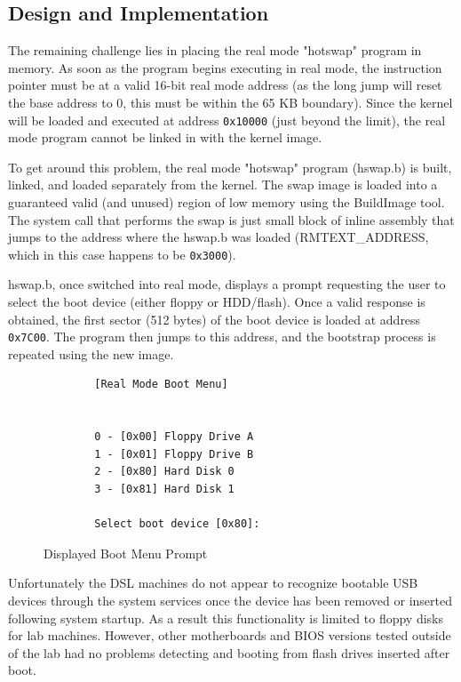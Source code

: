 \documentclass[titlepage]{article}
\begin{document}
\subsection{Design and Implementation}

The remaining challenge lies in placing the real mode "hotswap" program in
memory. As soon as the program begins executing in real mode, the instruction
pointer must be at a valid 16-bit real mode address (as the long jump will reset
the base address to 0, this must be within the 65 KB boundary). Since the kernel
will be loaded and executed at address \verb!0x10000! (just beyond the limit),
the real mode program cannot be linked in with the kernel image.

To get around this problem, the real mode "hotswap" program (hswap.b) is built,
linked, and loaded separately from the kernel. The swap image is loaded into
a guaranteed valid (and unused) region of low memory using the BuildImage tool.
The system call that performs the swap is just small block of inline assembly
that jumps to the address where the hswap.b was loaded (RMTEXT\_ADDRESS, which
in this case happens to be \verb!0x3000!).

hswap.b, once switched into real mode, displays a prompt requesting the user
to select the boot device (either floppy or HDD/flash). Once a valid response
is obtained, the first sector (512 bytes) of the boot device is loaded at
address \verb!0x7C00!. The program then jumps to this address, and the bootstrap
process is repeated using the new image.

\begin{figure}[!ht]
\begin{verbatim}
        [Real Mode Boot Menu]


        0 - [0x00] Floppy Drive A
        1 - [0x01] Floppy Drive B
        2 - [0x80] Hard Disk 0
        3 - [0x81] Hard Disk 1

        Select boot device [0x80]:
\end{verbatim}
\caption{Displayed Boot Menu Prompt}
\end{figure}

Unfortunately the DSL machines do not appear to recognize bootable USB devices
through the system services once the device has been removed or inserted 
following system startup. As a result this functionality is limited to floppy
disks for lab machines. However, other motherboards and BIOS versions tested
outside of the lab had no problems detecting and booting from flash drives
inserted after boot.
\end{document}
